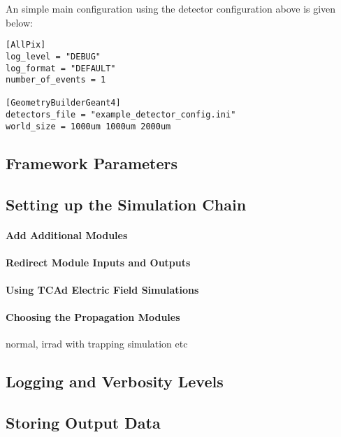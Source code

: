 An simple main configuration using the detector configuration above is given below:
\begin{verbatim}
[AllPix]
log_level = "DEBUG"
log_format = "DEFAULT"
number_of_events = 1

[GeometryBuilderGeant4]
detectors_file = "example_detector_config.ini"
world_size = 1000um 1000um 2000um
\end{verbatim}

\subsection{Framework Parameters}
\label{sec:framework_parameters}
\subsection{Setting up the Simulation Chain}
\paragraph{Add Additional Modules}
\paragraph{Redirect Module Inputs and Outputs}
\paragraph{Using TCAd Electric Field Simulations}
\paragraph{Choosing the Propagation Modules}
normal, irrad with trapping simulation etc
\subsection{Logging and Verbosity Levels}
\subsection{Storing Output Data}
